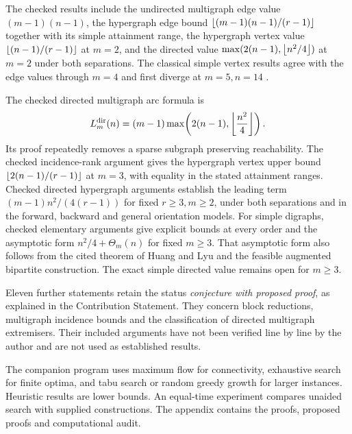 The checked results include the undirected multigraph edge value
$(m-1)(n-1)$, the hypergraph edge bound $\left\lfloor (m-1)(n-1)/(r-1) \right\rfloor$ together
with its simple attainment range, the hypergraph vertex value
$\left\lfloor (n-1)/(r-1) \right\rfloor$ at $m=2$, and the directed value
$\max(2(n-1),\left\lfloor n^2/4 \right\rfloor)$ at $m=2$ under both separations. The classical simple vertex results agree
with the edge values through $m=4$ and first diverge at $m=5,n=14$
\cite{Bartfai60,Bollobas66,Leonard72b,SorensenThomassen74}.

The checked directed multigraph arc formula is
\[
 L_m^{\mathrm{dir}}(n)=(m-1)\max\!\left(2(n-1),\left\lfloor \frac{n^2}{4} \right\rfloor\right).
\]
Its proof repeatedly removes a sparse subgraph preserving reachability.
The checked incidence-rank argument gives the hypergraph vertex upper bound
$\left\lfloor 2(n-1)/(r-1) \right\rfloor$ at $m=3$, with equality in the stated attainment
ranges. Checked directed hypergraph arguments establish the leading term
$(m-1)n^2/(4(r-1))$ for fixed $r\ge3,m\ge2$, under both separations and
in the forward, backward and general orientation models.
For simple digraphs, checked elementary arguments give explicit bounds at
every order and the asymptotic form $n^2/4+\Theta_m(n)$ for fixed $m\ge3$.
That asymptotic form also follows from the cited theorem of Huang and Lyu
and the feasible augmented bipartite construction. The exact simple directed
value remains open for $m\ge3$.

Eleven further statements retain the status \emph{conjecture with proposed
proof}, as explained in the Contribution Statement. They concern block
reductions, multigraph incidence bounds and the classification of directed
multigraph extremisers. Their included arguments have not been verified
line by line by the author and are not used as established results.

The companion program uses maximum flow for connectivity, exhaustive
search for finite optima, and tabu search or random greedy growth for
larger instances. Heuristic results are lower bounds. An equal-time
experiment compares unaided search with supplied constructions. The appendix
contains the proofs, proposed proofs and computational audit.

